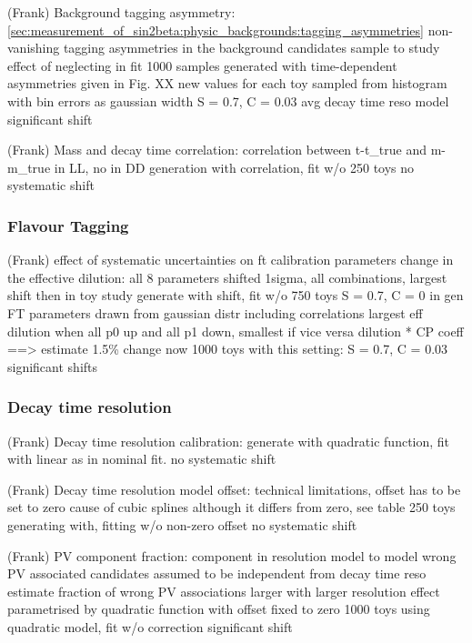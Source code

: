 (Frank)
Background tagging asymmetry:
\cf \cref{sec:measurement_of_sin2beta:physic_backgrounds:tagging_asymmetries}
non-vanishing tagging asymmetries in the background candidates sample
\ToyMC to study effect of neglecting in fit
1000 samples generated with time-dependent asymmetries given in Fig. XX
new values for each toy sampled from histogram with bin errors as gaussian width
S = 0.7, C = 0.03
avg decay time reso model
significant shift

(Frank)
Mass and decay time correlation:
correlation between t-t\_true and m-m\_true in LL, no in DD
generation with correlation, fit w/o
250 toys
no systematic shift

\subsubsection{Flavour Tagging}
\label{sec:measurement_of_sin2beta:systematics:systematics:tagging}

(Frank)
effect of systematic uncertainties on ft calibration parameters
change in the effective dilution: all 8 parameters shifted 1sigma, all combinations,
largest shift then in toy study
generate with shift, fit w/o
750 toys
S = 0.7, C = 0 in gen
FT parameters drawn from gaussian distr including correlations
largest eff dilution when all p0 up and all p1 down, smallest if vice versa
dilution * CP coeff ==> estimate 1.5\% change
now 1000 toys with this setting: S = 0.7, C = 0.03
significant shifts

\subsubsection{Decay time resolution}
\label{sec:measurement_of_sin2beta:systematics:systematics:resolution}

(Frank)
Decay time resolution calibration:
generate with quadratic function, fit with linear as in nominal fit.
no systematic shift

(Frank)
Decay time resolution model offset:
technical limitations, offset has to be set to zero cause of cubic splines although it differs from zero, see table
250 toys generating with, fitting w/o non-zero offset
no systematic shift

(Frank)
PV component fraction:
component in resolution model to model wrong PV associated candidates
assumed to be independent from decay time reso estimate
fraction of wrong PV associations larger with larger resolution
effect parametrised by quadratic function with offset fixed to zero
1000 toys using quadratic model, fit w/o correction
significant shift

